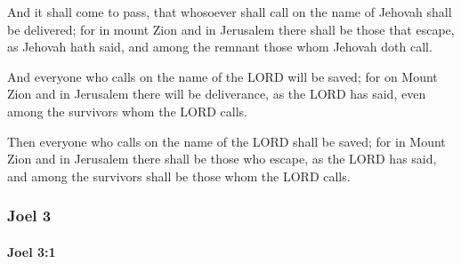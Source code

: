 			\begin{versebox}
					\item[BHS] 
					\item[LXX] 
					\item[ASV] And it shall come to pass, that whosoever shall call on the name of Jehovah shall be delivered; for in mount Zion and in Jerusalem there shall be those that escape, as Jehovah hath said, and among the remnant those whom Jehovah doth call.
					\item[NIV] And everyone who calls on the name of the LORD will be saved; for on Mount Zion and in Jerusalem there will be deliverance, as the LORD has said, even among the survivors whom the LORD calls.
					\item[NRSV] Then everyone who calls on the name of the LORD shall be saved; for in Mount Zion and in Jerusalem there shall be those who escape, as the LORD has said, and among the survivors shall be those whom the LORD calls.
			\end{versebox}
	\subsubsection{Joel 3} %
		\label{JOEL-3}

		\paragraph{Joel 3:1} %
			\label{JOEL-3-1}

